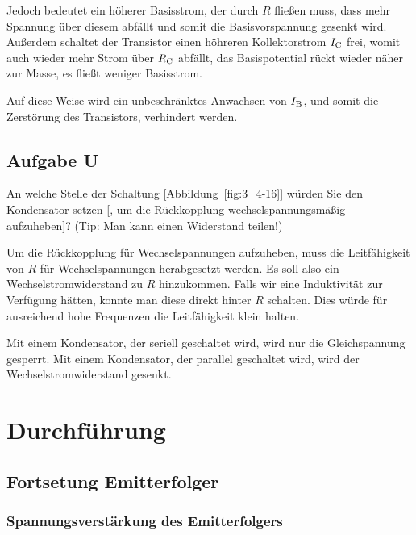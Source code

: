 Jedoch bedeutet ein höherer Basisstrom, der durch $R$ fließen muss, dass mehr
Spannung über diesem abfällt und somit die Basisvorspannung gesenkt wird.
Außerdem schaltet der Transistor einen höhreren Kollektorstrom $I_\text{C}$ frei,
womit auch wieder mehr Strom über $R_\text{C}$ abfällt, das Basispotential rückt
wieder näher zur Masse, es fließt weniger Basisstrom.

Auf diese Weise wird ein unbeschränktes Anwachsen von $I_\text{B}$, und somit die
Zerstörung des Transistors, verhindert werden.

\FloatBarrier
\subsection{Aufgabe U}

\begin{problem}
	An welche Stelle der Schaltung [Abbildung~\ref{fig:3_4-16}] würden Sie den
	Kondensator setzen [, um die Rückkopplung wechselspannungsmäßig
	aufzuheben]? (Tip: Man kann einen Widerstand teilen!)
\end{problem}

Um die Rückkopplung für Wechselspannungen aufzuheben, muss die Leitfähigkeit
von $R$ für Wechselspannungen herabgesetzt werden. Es soll also ein
Wechselstromwiderstand zu $R$ hinzukommen. Falls wir eine Induktivität zur
Verfügung hätten, konnte man diese direkt hinter $R$ schalten. Dies würde für
ausreichend hohe Frequenzen die Leitfähigkeit klein halten.

Mit einem Kondensator, der seriell geschaltet wird, wird nur die
Gleichspannung gesperrt. Mit einem Kondensator, der parallel geschaltet wird,
wird der Wechselstromwiderstand gesenkt.



\FloatBarrier
\section{Durchführung}

\subsection{Fortsetung Emitterfolger}

\subsubsection{Spannungsverstärkung des Emitterfolgers}

